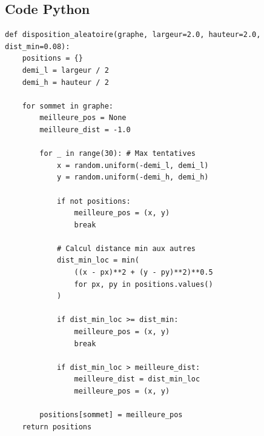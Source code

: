 \documentclass[12pt, a4paper]{article}
\begin{document}
\subsection{Code Python}
\begin{lstlisting}[style=python, caption={disposition\_aleatoire(graphe)}]
def disposition_aleatoire(graphe, largeur=2.0, hauteur=2.0, dist_min=0.08):
    positions = {}
    demi_l = largeur / 2
    demi_h = hauteur / 2
    
    for sommet in graphe:
        meilleure_pos = None
        meilleure_dist = -1.0
        
        for _ in range(30): # Max tentatives
            x = random.uniform(-demi_l, demi_l)
            y = random.uniform(-demi_h, demi_h)
            
            if not positions:
                meilleure_pos = (x, y)
                break
            
            # Calcul distance min aux autres
            dist_min_loc = min(
                ((x - px)**2 + (y - py)**2)**0.5 
                for px, py in positions.values()
            )
            
            if dist_min_loc >= dist_min:
                meilleure_pos = (x, y)
                break
                
            if dist_min_loc > meilleure_dist:
                meilleure_dist = dist_min_loc
                meilleure_pos = (x, y)
                
        positions[sommet] = meilleure_pos
    return positions
\end{lstlisting}
\end{document}
